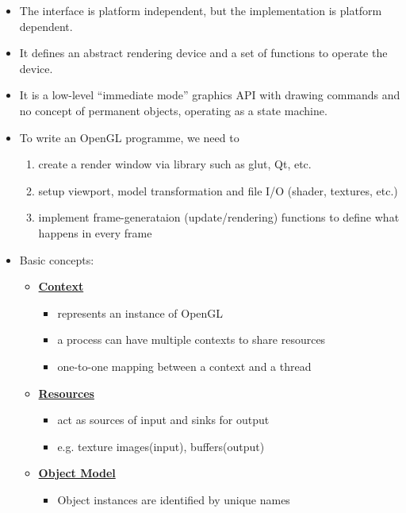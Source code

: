 \documentclass[twocolumn,landscape,10pt]{article}
\theoremstyle{definition}
\begin{document}
\begin{itemize}
    \item The interface is platform independent, but the implementation is
        platform dependent.
    \item It defines an abstract rendering device and a set of functions to
        operate the device.
    \item It is a low-level ``immediate mode'' graphics API with drawing
        commands and no concept of permanent objects, operating as a state
        machine.
    \item To write an OpenGL programme, we need to
        \begin{enumerate}
            \item create a render window via library such as glut, Qt, etc.
            \item setup viewport, model transformation and file I/O (shader,
                textures, etc.)
            \item implement frame-generataion (update/rendering) functions 
                to define what happens in every frame
        \end{enumerate} 
    \item Basic concepts:
        \begin{itemize}
            \item \underline{\textbf{Context}}
                \begin{itemize}
                    \item represents an instance of OpenGL
                    \item a process can have multiple contexts to share
                        resources
                    \item one-to-one mapping between a context and a thread
                \end{itemize} 
            \item \underline{\textbf{Resources}}
                \begin{itemize}
                    \item act as sources of input and sinks for output
                    \item e.g. texture images(input), buffers(output)
                \end{itemize} 
            \item \underline{\textbf{Object Model}}
                \begin{itemize}
                    \item Object instances are identified by unique names

\end{itemize}
\end{itemize}
\end{itemize}
\end{document}
